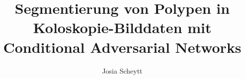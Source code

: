 

\title{Segmentierung von Polypen in Koloskopie-Bilddaten mit Conditional Adversarial Networks}
\author{Josia Scheytt}






\tableofcontents

\clearpage
{}
\begin{abstract}
	
\end{abstract}

\clearpage
{}
\begin{otherlanguage}{english}
\begin{abstract}
	
\end{abstract}
\end{otherlanguage}




\listoffigures
\listoftables
\printglossary[type=\acronymtype,title={Abkürzungsverzeichnis}]
\printbibliography[heading=bibintoc]




